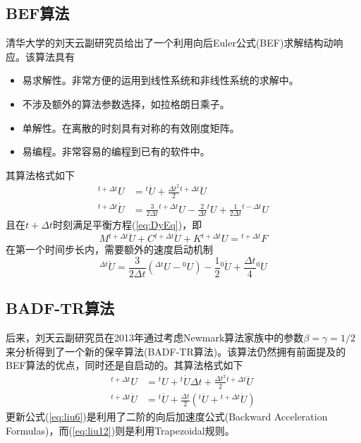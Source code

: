 \subsection{BEF算法}
清华大学的刘天云副研究员给出了一个利用向后Euler公式(BEF)求解结构动响应\cite{Liu2012}。该算法具有
\begin{itemize}
\item[\ddag] 易求解性。非常方便的运用到线性系统和非线性系统的求解中。
\item[\ddag] 不涉及额外的算法参数选择，如拉格朗日乘子。
\item[\ddag] 单解性。在离散的时刻具有对称的有效刚度矩阵。
\item[\ddag] 易编程。非常容易的编程到已有的软件中。
\end{itemize}
其算法格式如下
\begin{align}
{^{t+\Delta t}\!U}&={^t\!\dot{U}}+\frac{\Delta t^2}{2}{^{t+\Delta t}\!\ddot{U}}\\
{^{t+\Delta t}\!\dot{U}}&=\frac{3}{2\Delta t}{^{t+\Delta t}\!U}-\frac{2}{\Delta t}{^t\!U}+\frac{1}{2\Delta t}{^{t-\Delta t}\!U}
\end{align}
且在$t+\Delta t$时刻满足平衡方程(\ref{eq:DyEq})，即
\begin{equation}
	M{^{t+\Delta t}\!\ddot{U}}+C{^{t+\Delta t}\!\dot{U}}+K{^{t+\Delta t}\!U}={^{t+\Delta t}\!F}\label{eq:batheDyEq1}
\end{equation}
在第一个时间步长内，需要额外的速度启动机制
\begin{equation}
{^{\Delta t}\!\dot{U}}=\frac{3}{2\Delta t}({^{\Delta t}\!U}-{^0\!U})-\frac{1}{2}{^0\!\dot{U}}+\frac{\Delta t}{4}{^{0}\!\ddot{U}}
\end{equation}
\subsection{BADF-TR算法}
后来，刘天云副研究员在2013年通过考虑Newmark算法家族\cite{Newmark1959}中的参数$\beta=\gamma=1/2$来分析得到了一个新的保辛算法(BADF-TR算法)\cite{Liu2013}。该算法仍然拥有前面提及的BEF算法的优点，同时还是自启动的。其算法格式如下
\begin{align}
{^{t+\Delta t}\!U}&={^t\!U}+{^{t}\!\dot{U}}\Delta t+\frac{\Delta t^2}{2}{^{t+\Delta t}\!\ddot{U}}\label{eq:liu6}\\
{^{t+\Delta t}\!\dot{U}}&={^t\!\dot{U}}+\frac{\Delta t}{2}({^t\!\ddot{U}}+{^{t+\Delta t}\!\ddot{U}})\label{eq:liu12}
\end{align}
更新公式(\ref{eq:liu6})是利用了二阶的向后加速度公式(Backward Acceleration Formulas)，而(\ref{eq:liu12})则是利用Trapezoidal规则。


